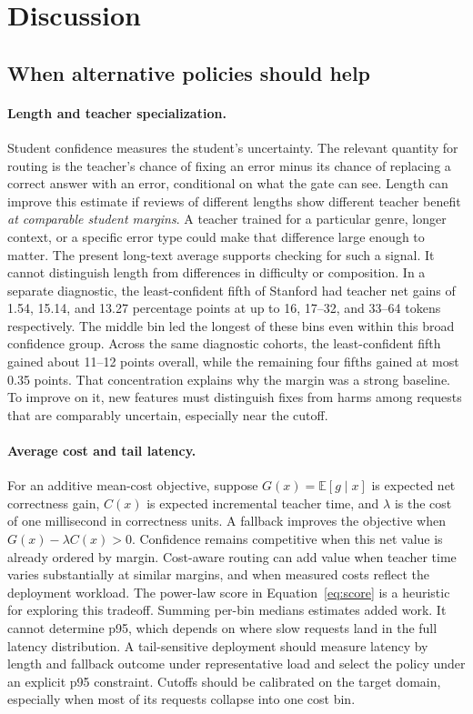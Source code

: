 \section{Discussion}
\subsection{When alternative policies should help}
\paragraph{Length and teacher specialization.}
Student confidence measures the student's uncertainty. The relevant quantity for routing is the teacher's chance of fixing an error minus its chance of replacing a correct answer with an error, conditional on what the gate can see. Length can improve this estimate if reviews of different lengths show different teacher benefit \emph{at comparable student margins}. A teacher trained for a particular genre, longer context, or a specific error type could make that difference large enough to matter. The present long-text average supports checking for such a signal. It cannot distinguish length from differences in difficulty or composition. In a separate diagnostic, the least-confident fifth of Stanford had teacher net gains of 1.54, 15.14, and 13.27 percentage points at up to 16, 17--32, and 33--64 tokens respectively. The middle bin led the longest of these bins even within this broad confidence group. Across the same diagnostic cohorts, the least-confident fifth gained about 11--12 points overall, while the remaining four fifths gained at most 0.35 points. That concentration explains why the margin was a strong baseline. To improve on it, new features must distinguish fixes from harms among requests that are comparably uncertain, especially near the cutoff.

\paragraph{Average cost and tail latency.}
For an additive mean-cost objective, suppose \(G(x)=\mathbb{E}[g\mid x]\) is expected net correctness gain, \(C(x)\) is expected incremental teacher time, and \(\lambda\) is the cost of one millisecond in correctness units. A fallback improves the objective when \(G(x)-\lambda C(x)>0\). Confidence remains competitive when this net value is already ordered by margin. Cost-aware routing can add value when teacher time varies substantially at similar margins, and when measured costs reflect the deployment workload. The power-law score in Equation~\ref{eq:score} is a heuristic for exploring this tradeoff. Summing per-bin medians estimates added work. It cannot determine p95, which depends on where slow requests land in the full latency distribution. A tail-sensitive deployment should measure latency by length and fallback outcome under representative load and select the policy under an explicit p95 constraint. Cutoffs should be calibrated on the target domain, especially when most of its requests collapse into one cost bin.


